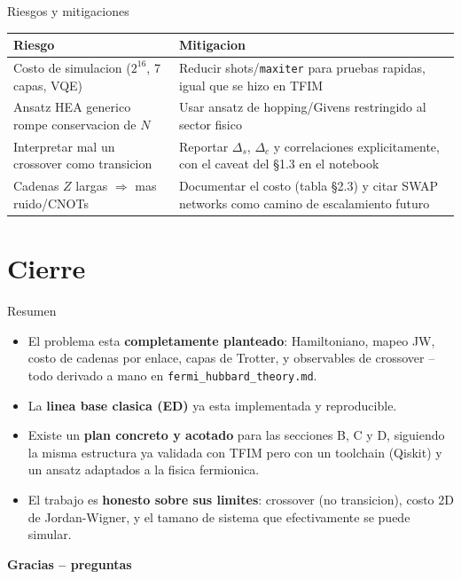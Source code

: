 \documentclass[aspectratio=169,10pt]{beamer}
\newcommand{\good}[1]{\textcolor{qAccent}{\textbf{#1}}}
\begin{document}
\begin{frame}{Riesgos y mitigaciones}
  \centering
  \renewcommand{\arraystretch}{1.25}
  \begin{tabular}{p{}p{}}
    \toprule
    \textbf{Riesgo} & \textbf{Mitigacion} \\
    \midrule
    Costo de simulacion ($2^{16}$, 7 capas, VQE) & Reducir shots/\texttt{maxiter} para pruebas
      rapidas, igual que se hizo en TFIM \\
    Ansatz HEA generico rompe conservacion de $N$ & Usar ansatz de hopping/Givens
      restringido al sector fisico \\
    Interpretar mal un crossover como transicion & Reportar $\Delta_s$, $\Delta_c$ y
      correlaciones explicitamente, con el caveat del \S1.3 en el notebook \\
    Cadenas $Z$ largas $\Rightarrow$ mas ruido/CNOTs & Documentar el costo (tabla \S2.3) y
      citar SWAP networks como camino de escalamiento futuro \\
    \bottomrule
  \end{tabular}
\end{frame}

\section{Cierre}

\begin{frame}{Resumen}
  \begin{itemize}
    \item El problema esta \good{completamente planteado}: Hamiltoniano, mapeo JW, costo de
      cadenas por enlace, capas de Trotter, y observables de crossover -- todo derivado a mano
      en \texttt{fermi\_hubbard\_theory.md}.
    \item La \good{linea base clasica (ED)} ya esta implementada y reproducible.
    \item Existe un \good{plan concreto y acotado} para las secciones B, C y D, siguiendo la
      misma estructura ya validada con TFIM pero con un toolchain (Qiskit) y un ansatz
      adaptados a la fisica fermionica.
    \item El trabajo es \good{honesto sobre sus limites}: crossover (no transicion), costo
      2D de Jordan-Wigner, y el tamano de sistema que efectivamente se puede simular.
  \end{itemize}
  \vfill
  \centering \large \textcolor{qDeep}{\textbf{Gracias -- preguntas}}
\end{frame}
\end{document}
